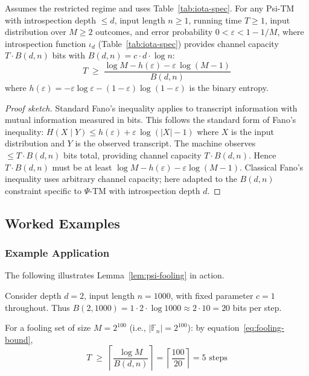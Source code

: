 \begin{lemma}
\label{lem:psi-fano}\label{Lk:psi-fano}
Assumes the restricted regime and uses Table~\ref{tab:iota-spec}.
For any Psi-TM with introspection depth $\leq d$, input length $n \geq 1$, running time $T \geq 1$, input distribution over $M \geq 2$ outcomes, and error probability $0 < \varepsilon < 1 - 1/M$, where introspection function $\iota_d$ (Table~\ref{tab:iota-spec}) provides channel capacity $T \cdot B(d,n)$ bits with $B(d,n) = c \cdot d \cdot \log n$:
\begin{equation}
\label{eq:fano-bound}
T \;\geq\; \frac{\log M - h(\varepsilon) - \varepsilon\,\log(M-1)}{B(d,n)}
\end{equation}
where $h(\varepsilon) = -\varepsilon \log \varepsilon - (1-\varepsilon) \log(1-\varepsilon)$ is the binary entropy.
\end{lemma}

\begin{proof}[Proof sketch]
Standard Fano's inequality applies to transcript information with mutual information measured in bits. This follows the standard form of Fano's inequality: $H(X\mid Y) \leq h(\varepsilon) + \varepsilon \, \log(|X|-1)$ where $X$ is the input distribution and $Y$ is the observed transcript. The machine observes $\leq T \cdot B(d,n)$ bits total, providing channel capacity $T \cdot B(d,n)$. Hence $T \cdot B(d,n)$ must be at least $\log M - h(\varepsilon) - \varepsilon \log(M-1)$. Classical Fano's inequality uses arbitrary channel capacity; here adapted to the $B(d,n)$ constraint specific to $\Psi$-TM with introspection depth $d$.
\end{proof}

\subsection{Worked Examples}
\subsubsection{Example Application}
The following illustrates Lemma~\ref{lem:psi-fooling} in action.

Consider depth $d = 2$, input length $n = 1000$, with fixed parameter $c = 1$ throughout.
Thus $B(2,1000) = 1 \cdot 2 \cdot \log 1000 \approx 2 \cdot 10 = 20$ bits per step.

For a fooling set of size $M = 2^{100}$ (i.e., $|\mathbb{F}_n| = 2^{100}$): by equation~\eqref{eq:fooling-bound},
\[T \;\geq\; \left\lceil \frac{\log M}{B(d,n)} \right\rceil = \left\lceil \frac{100}{20} \right\rceil = 5 \text{ steps}\]

